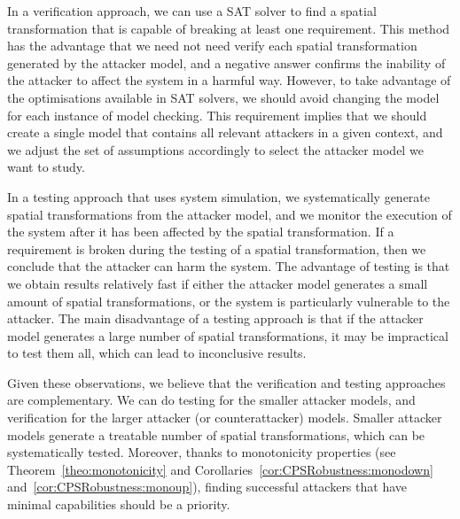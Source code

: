 In a verification approach, we can use a SAT solver to find a spatial transformation that is capable of breaking at least one requirement. This method has the advantage that we need not need verify each spatial transformation generated by the attacker model, and a negative answer confirms the inability of the attacker to affect the system in a harmful way. However, to take advantage of the optimisations available in SAT solvers, we should avoid changing the model for each instance of model checking. This requirement implies that we should create a single model that contains all relevant attackers in a given context, and we adjust the set of assumptions accordingly to select the attacker model we want to study. 

In a testing approach that uses system simulation, we systematically generate spatial transformations from the attacker model, and we monitor the execution of the system after it has been affected by the spatial transformation. If a requirement is broken during the testing of a spatial transformation, then we conclude that the attacker can harm the system. The advantage of testing is that we obtain results relatively fast if either the attacker model generates a small amount of spatial transformations, or the system is particularly vulnerable to the attacker. The main disadvantage of a testing approach is that if the attacker model generates a large number of spatial transformations, it may be impractical to test them all, which can lead to inconclusive results.

Given these observations, we believe that the verification and testing approaches are complementary. We can do testing for the smaller attacker models, and verification for the larger attacker (or counterattacker) models. Smaller attacker models generate a treatable number of spatial transformations, which can be systematically tested. Moreover, thanks to monotonicity properties (see Theorem~\ref{theo:monotonicity} and Corollaries~\ref{cor:CPSRobustness:monodown} and~\ref{cor:CPSRobustness:monoup}), finding successful attackers that have minimal capabilities should be a priority. %

